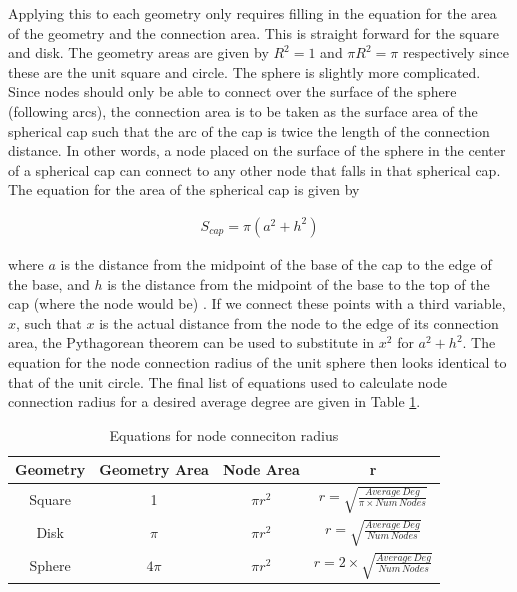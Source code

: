 \documentclass{article}
\begin{document}
        Applying this to each geometry only requires filling in the equation for the area of the geometry and the connection area. This is straight forward for the square and disk. The geometry areas are given by $R^2 = 1$ and $\pi R^2 = \pi$ respectively since these are the unit square and circle. The sphere is slightly more complicated. Since nodes should only be able to connect over the surface of the sphere (following arcs), the connection area is to be taken as the surface area of the spherical cap such that the arc of the cap is twice the length of the connection distance. In other words, a node placed on the surface of the sphere in the center of a spherical cap can connect to any other node that falls in that spherical cap. The equation for the area of the spherical cap is given by

        \begin{align}
            S_{cap} = \pi (a^2 + h^2)
        \end{align}

        where $a$ is the distance from the midpoint of the base of the cap to the edge of the base, and $h$ is the distance from the midpoint of the base to the top of the cap (where the node would be) \cite{spherecap}. If we connect these points with a third variable, $x$, such that $x$ is the actual distance from the node to the edge of its connection area, the Pythagorean theorem can be used to substitute in $x^2$ for $a^2 + h^2$. The equation for the node connection radius of the unit sphere then looks identical to that of the unit circle. The final list of equations used to calculate node connection radius for a desired average degree are given in Table \ref{tab4}.

        \begin{center}
            \begin{table}[h]
                \centering
                \begin{tabular}{|c|c|c|c|}
                    \hline
                    Geometry & Geometry Area & Node Area & r \\
                    \hline
                    Square & 1 & $\pi r^2$ & $r = \sqrt{\frac{Average\,Deg}{\pi \times Num\,Nodes}}$ \\
                    Disk & $\pi$ & $\pi r^2$ & $r = \sqrt{\frac{Average\,Deg}{Num\,Nodes}}$ \\
                    Sphere & $4\pi$ & $\pi r^2$ & $r = 2 \times \sqrt{\frac{Average\,Deg}{Num\,Nodes}}$ \\
                    \hline
                \end{tabular}

                \caption{Equations for node conneciton radius}
                \label{tab4}
            \end{table}
        \end{center}
\end{document}
